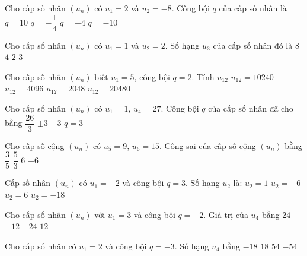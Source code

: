 \begin{ex}
Cho cấp số nhân $(u_n)$ có $u_1=2$ và $u_2=-8$. Công bội $q$ của cấp số nhân là
\choice
{$q=10$}
{$q=-\dfrac{1}{4}$}
{\True $q=-4$}
{$q=-10$}
\end{ex}
\begin{ex}
Cho cấp số nhân $(u_n)$ có $u_1=1$ và $u_2=2$. Số hạng $u_3$ của cấp số nhân đó là 
\choice
{$8$}
{\True $4$}
{$2$}
{$3$}
\end{ex}
\begin{ex}
Cho cấp số nhân $(u_n)$ biết $u_1=5$, công bội $q=2$. Tính $u_{12}$
\choice
{\True $u_{12}=10240$}
{$u_{12}=4096$}
{$u_{12}=2048$}
{$u_{12}=20480$}
\end{ex}
\begin{ex}
Cho cấp số nhân $(u_n)$ có $u_1=1$, $u_4=27$. Công bội $q$ của cấp số nhân đã cho bằng
\choice
{$\dfrac{26}{3}$}
{$\pm 3$}
{$-3$}
{\True $q=3$}
\end{ex}
\begin{ex}
Cho cấp số cộng $(u_n)$ có $u_5=9$, $u_6=15$. Công sai của cấp số cộng $(u_n)$ bằng
\choice
{$\dfrac{3}{5}$}
{$\dfrac{5}{3}$}
{\True $6$}
{$-6$}
\end{ex}
\begin{ex}
Cấp số nhân $(u_n)$ có $u_1=-2$ và công bội $q=3$. Số hạng $u_2$ là:
\choice
{$u_2=1$}
{\True $u_2=-6$}
{$u_2=6$}
{$u_2=-18$}
\end{ex}
\begin{ex}
Cho cấp số nhân $(u_n)$ với $u_1=3$ và công bội $q=-2$. Giá trị của $u_4$ bằng 
\choice
{$24$}
{$-12$}
{\True $-24$}
{$12$}
\end{ex}
\begin{ex}
Cho cấp số nhân có $u_1=2$ và công bội $q=-3$. Số hạng $u_4$ bằng
\choice
{$-18$}
{$18$}
{$54$}
{\True $-54$}
\end{ex}
